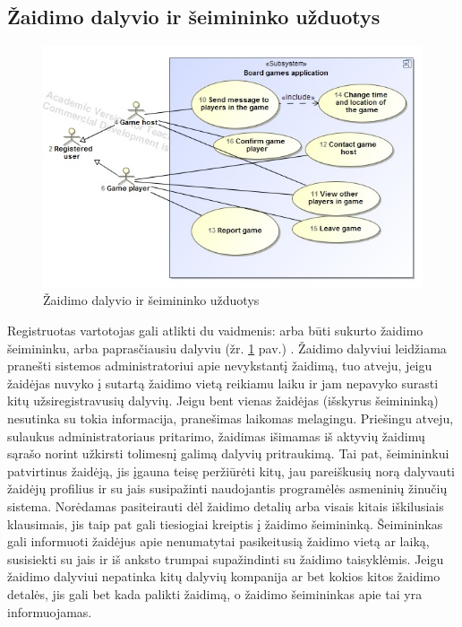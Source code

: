 \documentclass{VUMIFPSkursinis}
\begin{document}
	\subsection{Žaidimo dalyvio ir šeimininko užduotys}
		\begin{figure}[H]
			\centering
			\includegraphics[scale=0.5]{img/UzduociuDiagrama2}
			\caption{Žaidimo dalyvio ir šeimininko užduotys}
			\label{img:UzduociuDiagrama2}
		\end{figure}
		Registruotas vartotojas gali atlikti du vaidmenis: arba būti sukurto žaidimo šeimininku, arba paprasčiausiu dalyviu (žr. \ref{img:UzduociuDiagrama2} pav.) . Žaidimo dalyviui leidžiama pranešti sistemos administratoriui apie nevykstantį žaidimą, tuo atveju, jeigu žaidėjas nuvyko į sutartą žaidimo vietą reikiamu laiku ir jam nepavyko surasti kitų užsiregistravusių dalyvių. Jeigu bent vienas žaidėjas (išskyrus šeimininką) nesutinka su tokia informacija, pranešimas laikomas melagingu. Priešingu atveju, sulaukus administratoriaus pritarimo, žaidimas išimamas iš aktyvių žaidimų sąrašo norint užkirsti tolimesnį galimą dalyvių pritraukimą. Tai pat, šeimininkui patvirtinus žaidėją, jis įgauna teisę peržiūrėti kitų, jau pareiškusių norą dalyvauti žaidėjų profilius ir su jais susipažinti naudojantis programėlės asmeninių žinučių sistema. Norėdamas pasiteirauti dėl žaidimo detalių arba visais kitais iškilusiais klausimais, jis taip pat gali tiesiogiai kreiptis į žaidimo šeimininką. Šeimininkas gali informuoti žaidėjus apie nenumatytai pasikeitusią žaidimo vietą ar laiką, susisiekti su jais ir iš anksto trumpai supažindinti su žaidimo taisyklėmis. Jeigu žaidimo dalyviui nepatinka kitų dalyvių kompanija ar bet kokios kitos žaidimo detalės, jis gali bet kada palikti žaidimą, o žaidimo šeimininkas apie tai yra informuojamas.
\end{document}
